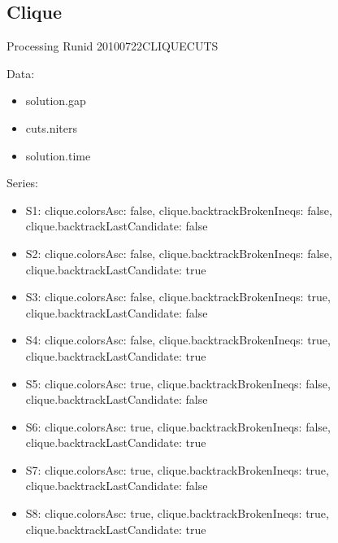 \documentclass[landscape, 12pt]{report}
\begin{document}
	\subsection{Clique}
	
	Processing Runid 20100722CLIQUECUTS

Data:
\begin{itemize}
\item solution.gap
\item cuts.niters
\item solution.time
\end{itemize}
Series:
\begin{itemize}
\item S1: clique.colorsAsc: false, clique.backtrackBrokenIneqs: false, clique.backtrackLastCandidate: false
\item S2: clique.colorsAsc: false, clique.backtrackBrokenIneqs: false, clique.backtrackLastCandidate: true
\item S3: clique.colorsAsc: false, clique.backtrackBrokenIneqs: true, clique.backtrackLastCandidate: false
\item S4: clique.colorsAsc: false, clique.backtrackBrokenIneqs: true, clique.backtrackLastCandidate: true
\item S5: clique.colorsAsc: true, clique.backtrackBrokenIneqs: false, clique.backtrackLastCandidate: false
\item S6: clique.colorsAsc: true, clique.backtrackBrokenIneqs: false, clique.backtrackLastCandidate: true
\item S7: clique.colorsAsc: true, clique.backtrackBrokenIneqs: true, clique.backtrackLastCandidate: false
\item S8: clique.colorsAsc: true, clique.backtrackBrokenIneqs: true, clique.backtrackLastCandidate: true
\end{itemize}
\end{document}
